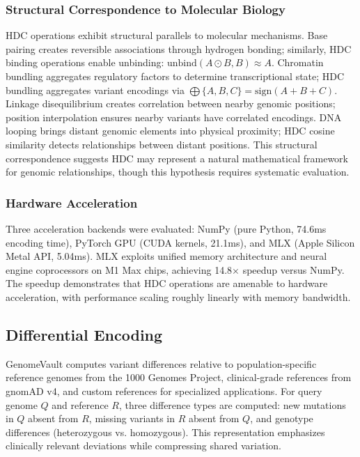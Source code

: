 \documentclass[11pt,letterpaper]{article}
\begin{document}
\subsubsection{Structural Correspondence to Molecular Biology}

HDC operations exhibit structural parallels to molecular mechanisms. Base pairing creates reversible associations through hydrogen bonding; similarly, HDC binding operations enable unbinding: $\text{unbind}(A \odot B, B) \approx A$. Chromatin bundling aggregates regulatory factors to determine transcriptional state; HDC bundling aggregates variant encodings via $\bigoplus\{A, B, C\} = \text{sign}(A + B + C)$. Linkage disequilibrium creates correlation between nearby genomic positions; position interpolation ensures nearby variants have correlated encodings. DNA looping brings distant genomic elements into physical proximity; HDC cosine similarity detects relationships between distant positions. This structural correspondence suggests HDC may represent a natural mathematical framework for genomic relationships, though this hypothesis requires systematic evaluation.

\subsubsection{Hardware Acceleration}

Three acceleration backends were evaluated: NumPy (pure Python, 74.6ms encoding time), PyTorch GPU (CUDA kernels, 21.1ms), and MLX (Apple Silicon Metal API, 5.04ms). MLX exploits unified memory architecture and neural engine coprocessors on M1 Max chips, achieving 14.8$\times$ speedup versus NumPy. The speedup demonstrates that HDC operations are amenable to hardware acceleration, with performance scaling roughly linearly with memory bandwidth.

\subsection{Differential Encoding}

GenomeVault computes variant differences relative to population-specific reference genomes from the 1000 Genomes Project, clinical-grade references from gnomAD v4, and custom references for specialized applications. For query genome $Q$ and reference $R$, three difference types are computed: new mutations in $Q$ absent from $R$, missing variants in $R$ absent from $Q$, and genotype differences (heterozygous vs. homozygous). This representation emphasizes clinically relevant deviations while compressing shared variation.
\end{document}
